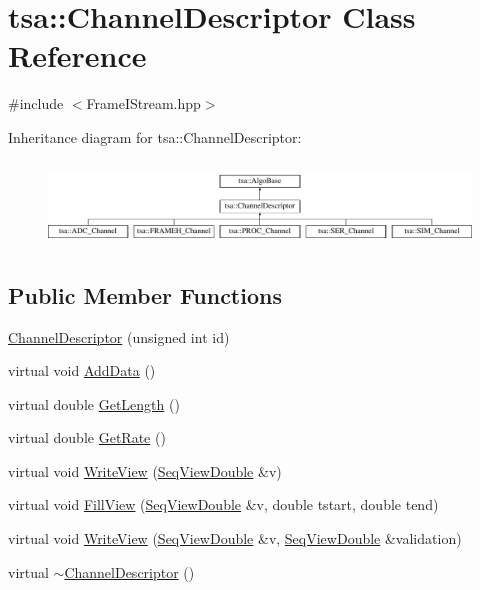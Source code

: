 \hypertarget{classtsa_1_1_channel_descriptor}{}\section{tsa\+:\+:Channel\+Descriptor Class Reference}
\label{classtsa_1_1_channel_descriptor}


{\ttfamily \#include $<$Frame\+I\+Stream.\+hpp$>$}

Inheritance diagram for tsa\+:\+:Channel\+Descriptor\+:\begin{figure}[H]
\begin{center}
\leavevmode
\includegraphics[height=2.255033cm]{classtsa_1_1_channel_descriptor}
\end{center}
\end{figure}
\subsection*{Public Member Functions}
\begin{DoxyCompactItemize}
\item 
\hyperlink{classtsa_1_1_channel_descriptor_a320624e156e5d856077465474bc7154f}{Channel\+Descriptor} (unsigned int id)
\item 
virtual void \hyperlink{classtsa_1_1_channel_descriptor_aa1e001a5e712415cd4e9d66846914a56}{Add\+Data} ()
\item 
virtual double \hyperlink{classtsa_1_1_channel_descriptor_a456d14e6136c389fbd307fabab7d7b73}{Get\+Length} ()
\item 
virtual double \hyperlink{classtsa_1_1_channel_descriptor_a602c501d3fa47c0951ae45f78336a1a8}{Get\+Rate} ()
\item 
virtual void \hyperlink{classtsa_1_1_channel_descriptor_a5ebd9a8bf358666b2cd9ae00056d2728}{Write\+View} (\hyperlink{namespacetsa_ac599574bcc094eda25613724b8f3ca9e}{Seq\+View\+Double} \&v)
\item 
virtual void \hyperlink{classtsa_1_1_channel_descriptor_a6553da04ba33471fc5465b6bd2b5275c}{Fill\+View} (\hyperlink{namespacetsa_ac599574bcc094eda25613724b8f3ca9e}{Seq\+View\+Double} \&v, double tstart, double tend)
\item 
virtual void \hyperlink{classtsa_1_1_channel_descriptor_a51b2df6d09b5b0b07d2a9ecda6fffa2b}{Write\+View} (\hyperlink{namespacetsa_ac599574bcc094eda25613724b8f3ca9e}{Seq\+View\+Double} \&v, \hyperlink{namespacetsa_ac599574bcc094eda25613724b8f3ca9e}{Seq\+View\+Double} \&validation)
\item 
virtual \hyperlink{classtsa_1_1_channel_descriptor_a2b4f201421dcd2cc9d2c1705fe4bea61}{$\sim$\+Channel\+Descriptor} ()
\end{DoxyCompactItemize}
